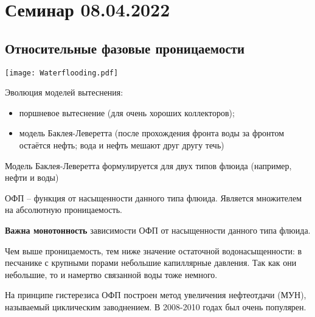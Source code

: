 \documentclass[main.tex]{subfiles}
\begin{document}
\section{Семинар 08.04.2022}

\subsection{Относительные фазовые проницаемости}

\texttt{[image: Waterflooding.pdf]}

Эволюция моделей вытеснения:
\begin{itemize}
	\item поршневое вытеснение (для очень хороших коллекторов);
	\item модель Баклея-Леверетта (после прохождения фронта воды за фронтом остаётся нефть; вода и нефть мешают друг другу течь)
\end{itemize}

Модель Баклея-Леверетта формулируется для двух типов флюида (например, нефти и воды)

ОФП -- функция от насыщенности данного типа флюида. Является множителем на абсолютную проницаемость.

\textbf{Важна монотонность} зависимости ОФП от насыщенности данного типа флюида.


Чем выше проницаемость, тем ниже значение остаточной водонасыщенности: в песчанике с крупными порами небольшие капиллярные давления. Так как они небольшие, то и намертво связанной воды тоже немного.






На принципе гистерезиса ОФП построен метод увеличения нефтеотдачи (МУН), называемый циклическим заводнением. В 2008-2010 годах был очень популярен.

\end{document}
